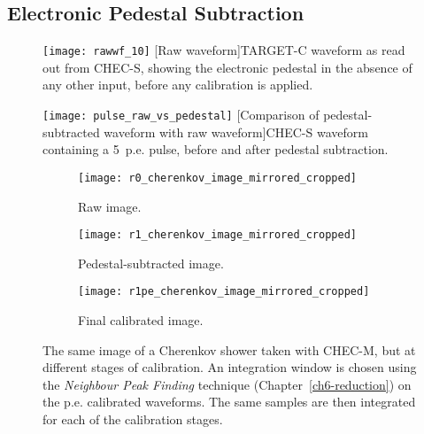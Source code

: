 \subsection{Electronic Pedestal Subtraction}

\the\textwidth

\begin{figure}
\begin{minipage}[t]{.49\textwidth}
  \centering
  \texttt{[image: rawwf\_10]} 
  [Raw waveform]{TARGET-C waveform as read out from CHEC-S, showing the electronic pedestal in the absence of any other input, before any calibration is applied.}
  \label{fig:rawwf}
\end{minipage}%
\hfill
\begin{minipage}[t]{.49\textwidth}
  \centering
  \texttt{[image: pulse\_raw\_vs\_pedestal]}
  [Comparison of pedestal-subtracted waveform with raw waveform]{CHEC-S waveform  containing a 5~p.e. pulse, before and after pedestal subtraction.}
  \label{fig:pulse_raw_vs_pedestal}
\end{minipage}
\end{figure}

\begin{figure}
  \begin{subfigure}[b]{0.49\textwidth}
    \texttt{[image: r0\_cherenkov\_image\_mirrored\_cropped]}
    \caption{Raw image.}
    \label{fig:r0_cherenkov_image_mirrored_cropped}
  \end{subfigure}
  \hfill
  \begin{subfigure}[b]{0.49\textwidth}
    \texttt{[image: r1\_cherenkov\_image\_mirrored\_cropped]}
    \caption{Pedestal-subtracted image.}
    \label{fig:r1_cherenkov_image_mirrored_cropped}
  \end{subfigure}
  \centering
  \begin{subfigure}[b]{0.49\textwidth}
    \texttt{[image: r1pe\_cherenkov\_image\_mirrored\_cropped]}
    \caption{Final calibrated image.}
    \label{fig:r1pe_cherenkov_image_mirrored_cropped}
  \end{subfigure}
  \caption[Comparison of calibration stages with a Cherenkov shower image.]{The same image of a Cherenkov shower taken with CHEC-M, but at different stages of calibration. An integration window is chosen using the \textit{Neighbour Peak Finding} technique (Chapter~\ref{ch6-reduction}) on the p.e. calibrated waveforms. The same samples are then integrated for each of the calibration stages.}
\end{figure}

